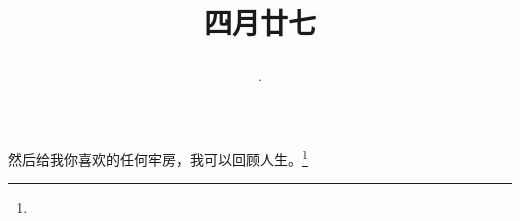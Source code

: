 \title{\date[d=3,m=6,y=2024][year:cn-y,年,month:cn,day:cn,日,·,weekday]·四月廿七 }
然后给我你喜欢的任何牢房，我可以回顾人生。\footnote{ }

